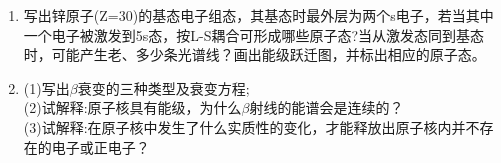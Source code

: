 \begin{enumerate}
(2)画出锂原子中价电子处于n=3时原子的能级图(一般结构与精细结构)，并标出相应的原子态;\\
(3)试比较(1)与(2)的能级特点，并说明能级分裂的原因。
\item 写出锌原子(Z=30)的基态电子组态，其基态时最外层为两个s电子，若当其中一个电子被激发到5s态，按L-S耦合可形成哪些原子态?当从激发态同到基态时，可能产生老、多少条光谱线？画出能级跃迁图，并标出相应的原子态。
\item (1)写出$\beta$衰变的三种类型及衰变方程;\\
(2)试解释:原子核具有能级，为什么$\beta$射线的能谱会是连续的？\\
(3)试解释:在原子核中发生了什么实质性的变化，才能释放出原子核内并不存在的电子或正电子？
\end{enumerate} 